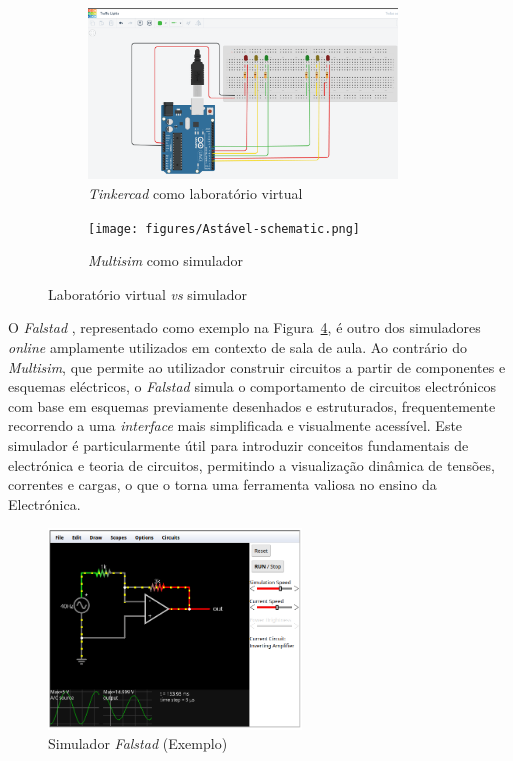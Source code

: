 \begin{figure}[hbtp]
    \centering
    \begin{subfigure}[hbtp]{0.48\textwidth}
        \centering
        \includegraphics[width=0.9\textwidth]{figures/tinkercad_exemplo.png}
        \caption{\textit{Tinkercad} como laboratório virtual \cite{tinkercad}}
        \label{fig:tinkercadVL}
    \end{subfigure}
    \begin{subfigure}[hbtp]{0.48\textwidth}
        \texttt{[image: figures/Astável-schematic.png]}
        \caption{\textit{Multisim} como simulador \cite{multisim}}
        \label{fig:multisimSimulador}
    \end{subfigure}
    \caption{Laboratório virtual \textit{vs} simulador}
    \label{fig:tinkercad}
\end{figure}

O \textit{Falstad} \cite{falstad}, representado como exemplo na Figura~\ref{fig:falstad}, é outro dos simuladores \textit{online} amplamente utilizados em contexto de sala de aula. Ao contrário do \textit{Multisim}, que permite ao utilizador construir circuitos a partir de componentes e esquemas eléctricos, o \textit{Falstad} simula o comportamento de circuitos electrónicos com base em esquemas previamente desenhados e estruturados, frequentemente recorrendo a uma \textit{interface} mais simplificada e visualmente acessível. Este simulador é particularmente útil para introduzir conceitos fundamentais de electrónica e teoria de circuitos, permitindo a visualização dinâmica de tensões, correntes e cargas, o que o torna uma ferramenta valiosa no ensino da Electrónica.

\begin{figure}[hbtp]
    \centering
    \includegraphics[width=0.6\textwidth]{figures/falstad.png}
    \caption{Simulador \textit{Falstad} (Exemplo) \cite{falstad}}
    \label{fig:falstad}
\end{figure}

